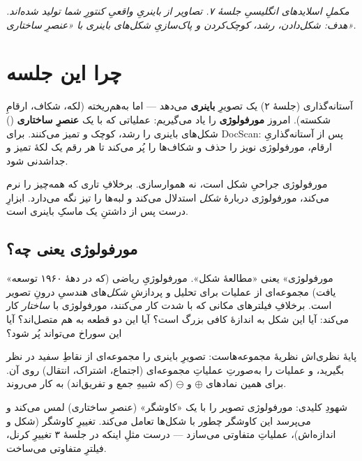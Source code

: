 \documentclass[12pt,a4paper]{article}
\begin{document}

{\small\itshape مکملِ اسلایدهای انگلیسیِ جلسهٔ ۷. تصاویر از باینریِ واقعیِ کنتورِ شما تولید شده‌اند. هدف: شکل‌دادن، رشد، کوچک‌کردن و پاک‌سازیِ شکل‌های باینری با «عنصرِ ساختاری».}

\vspace{0.5cm}
\tableofcontents
\vspace{1cm}

\section{چرا این جلسه}

آستانه‌گذاری (جلسهٔ ۲) یک تصویرِ \textbf{باینری} می‌دهد — اما به‌هم‌ریخته (لکه، شکاف، ارقامِ شکسته).
امروز \textbf{مورفولوژی} را یاد می‌گیریم: عملیاتی که با یک \textbf{عنصرِ ساختاری} () شکل‌های
باینری را رشد، کوچک و تمیز می‌کنند. برای DocScan: پس از آستانه‌گذاریِ ارقام، مورفولوژی نویز را حذف
و شکاف‌ها را پُر می‌کند تا هر رقم یک لکهٔ تمیز و جداشدنی شود.

\begin{nokte}
مورفولوژی جراحیِ شکل است، نه هموارسازی. برخلافِ تاری که همه‌چیز را نرم می‌کند، مورفولوژی دربارهٔ
\emph{شکل} استدلال می‌کند و لبه‌ها را تیز نگه می‌دارد. ابزارِ درست پس از داشتنِ یک ماسکِ باینری است.
\end{nokte}

\subsection{مورفولوژی یعنی چه؟}

«مورفولوژی» یعنی «مطالعهٔ شکل». مورفولوژیِ ریاضی (که در دههٔ ۱۹۶۰ توسعه یافت) مجموعه‌ای از عملیات
برای تحلیل و پردازشِ \emph{شکل}‌های هندسیِ درونِ تصویر است. برخلافِ فیلترهای مکانی که با شدت کار
می‌کنند، مورفولوژی با \emph{ساختار} کار می‌کند: آیا این شکل به اندازهٔ کافی بزرگ است؟ آیا این
دو قطعه به هم متصل‌اند؟ آیا این سوراخ می‌تواند پُر شود؟

پایهٔ نظری‌اش نظریهٔ مجموعه‌هاست: تصویرِ باینری را مجموعه‌ای از نقاطِ سفید در نظر بگیرید، و عملیات
را به‌صورتِ عملیاتِ مجموعه‌ای (اجتماع، اشتراک، انتقال) روی آن. برای همین نمادهای $\oplus$ و
$\ominus$ (که شبیهِ جمع و تفریق‌اند) به کار می‌روند.

\begin{yaddasht}
شهودِ کلیدی: مورفولوژی تصویر را با یک «کاوشگر» (عنصرِ ساختاری) لمس می‌کند و می‌پرسد این کاوشگر
چطور با شکل‌ها تعامل می‌کند. تغییرِ کاوشگر (شکل و اندازه‌اش)، عملیاتِ متفاوتی می‌سازد — درست مثلِ
اینکه در جلسهٔ ۳ تغییرِ کرنل، فیلترِ متفاوتی می‌ساخت.
\end{yaddasht}
\end{document}
